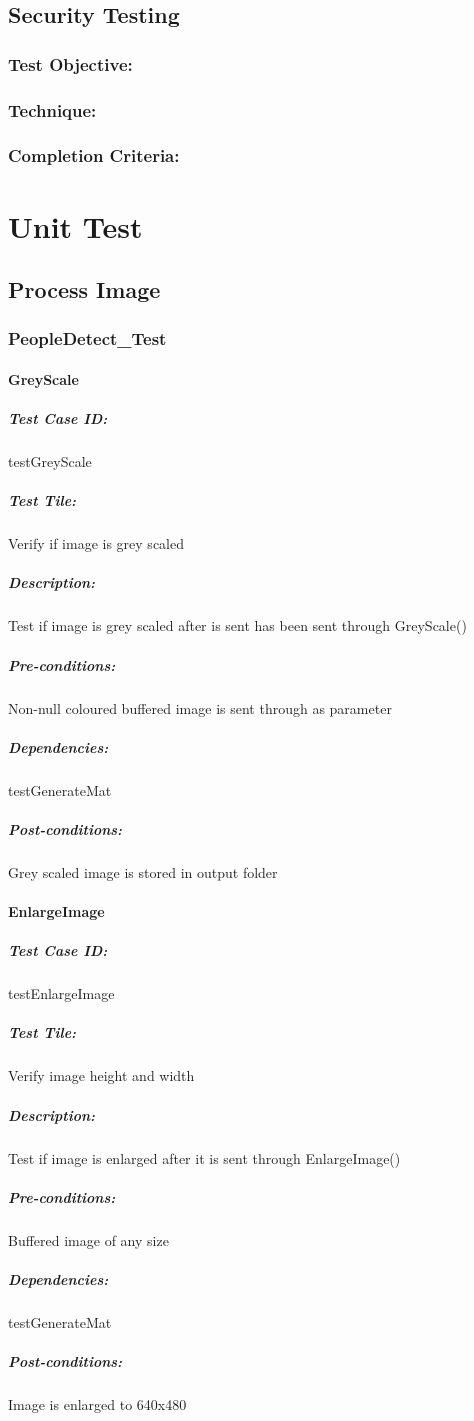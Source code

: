 \documentclass[a4paper,12pt]{report}
\begin{document}
		\subsection {Security Testing}
			\subsubsection {Test Objective:}
			\subsubsection {Technique:}
			\subsubsection {Completion Criteria:}
\fi

\section {Unit Test}
	\subsection {Process Image}
		\subsubsection {PeopleDetect\_Test}
			\paragraph {GreyScale}
				\subparagraph {Test Case ID:}
					testGreyScale
				\subparagraph {Test Tile:}
					Verify if image is grey scaled
				\subparagraph {Description:}
					Test if image is grey scaled after is sent has been sent through GreyScale()
				\subparagraph {Pre-conditions:}
					Non-null coloured buffered image is sent through as parameter
				\subparagraph {Dependencies:}
					testGenerateMat				
				\subparagraph {Post-conditions:}
					Grey scaled image is stored in output folder
					
			\paragraph {EnlargeImage}
				\subparagraph {Test Case ID:}
					testEnlargeImage
				\subparagraph {Test Tile:}
					Verify image height and width
				\subparagraph {Description:}
					Test if image is enlarged after it is sent through EnlargeImage()
				\subparagraph {Pre-conditions:}
					Buffered image of any size
				\subparagraph {Dependencies:}
					testGenerateMat				
				\subparagraph {Post-conditions:}
					Image is enlarged to 640x480
\end{document}
